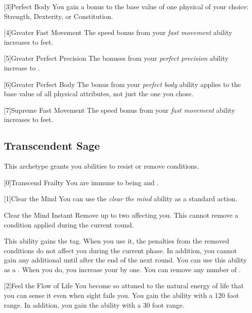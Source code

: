         [3]{Perfect Body} You gain a  bonus to the base value of one physical  of your choice: Strength, Dexterity, or Constitution.

        [4]{Greater Fast Movement} The speed bonus from your \textit{fast movement} ability increases to  feet.

        [5]{Greater Perfect Precision} The bonuses from your \textit{perfect precision} ability increase to .

        [6]{Greater Perfect Body} The bonus from your \textit{perfect body} ability applies to the base value of all physical attributes, not just the one you chose.

        [7]{Supreme Fast Movement} The speed bonus from your \textit{fast movement} ability increases to  feet.

    \newpage
    \subsection{Transcendent Sage}
        This archetype grants you abilities to resist or remove conditions.

        [0]{Transcend Frailty}
        You are immune to being \sickened and \nauseated.

        [1]{Clear the Mind} You can use the \textit{clear the mind} ability as a standard action.
        \begin{instantability}{Clear the Mind}
            Instant
            \rankline
            Remove up to two  affecting you.
            This cannot remove a condition applied during the current round.

            \rankline
             This ability gains the  tag.
            When you use it, the penalties from the removed conditions do not affect you during the current phase.
            In addition, you cannot gain any additional  until after the end of the next round.
             You can use this ability as a .
            When you do, you increase your  by one.
             You can remove any number of .
        \end{instantability}

        [2]{Feel the Flow of Life} You become so attuned to the natural energy of life that you can sense it even when sight fails you.
        You gain the  ability with a 120 foot range.
        In addition, you gain the  ability with a 30 foot range.

